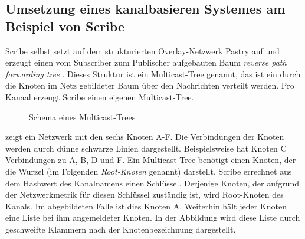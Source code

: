 \subsection[Umsetzung eines kanalbasieren Systemes]{Umsetzung eines kanalbasieren Systemes am Beispiel von Scribe}
\label{chap:related:scribe}
Scribe \cite{Castro2002Scribe} selbst setzt auf dem strukturierten Overlay-Netzwerk Pastry \cite{Rowstron2001} auf und erzeugt einen vom Subscriber zum Publischer aufgebauten Baum \emph{reverse path forwarding tree} \cite{Dalal1978}. Dieses Struktur ist ein Multicast-Tree genannt, das ist ein durch die Knoten im Netz gebildeter Baum über den Nachrichten verteilt werden. Pro Kanaal erzeugt Scribe einen eigenen Multicast-Tree.


\begin{figure}[htbp]
\centering
{}
\caption{Schema eines Multicast-Trees}
\label{fig:multicast_tree}
\end{figure}

 zeigt ein Netzwerk mit den sechs Knoten A-F. Die Verbindungen der Knoten werden durch dünne schwarze Linien dargestellt. Beispielsweise hat Knoten C Verbindungen zu A, B, D und F. Ein Multicast-Tree benötigt einen Knoten, der die Wurzel (im Folgenden \emph{Root-Knoten} genannt) darstellt. Scribe errechnet aus dem Hashwert des Kanalnamens einen Schlüssel. Derjenige Knoten, der aufgrund der Netzwerkmetrik für diesen Schlüssel zuständig ist, wird Root-Knoten des Kanals. Im abgebildeten Falle ist dies Knoten A. Weiterhin hält jeder Knoten eine Liste bei ihm angemeldeter Knoten. In der Abbildung wird diese Liste durch geschweifte Klammern nach der Knotenbezeichnung dargestellt.

